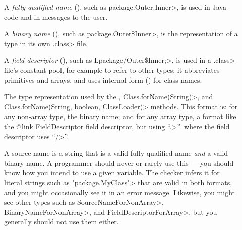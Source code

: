 \begin{description}

\item[]
  A \emph{fully qualified name} (), such as
  \<package.Outer.Inner>, is used in Java code and in messages to
  the user.

\item[]
  A \emph{binary name} (), such as
  \<package.Outer\$Inner>, is
  the representation of a type in its own \<.class> file.

\item[]
  A \emph{field descriptor} (), such as
  \<Lpackage/Outer\$Inner;>, is used in a \<.class> file's constant pool,
  for example to refer to other types; it abbreviates primitives and
  arrays, and uses internal form () for class names.

\item[]
\begin{sloppypar}
  The type representation used by the
  , \<Class.forName(String)>,
  and \<Class.forName(String, boolean, ClassLoader)> methods.  This format
  is:  for any non-array type, the binary name; and for any array type, a
  format like the {@link FieldDescriptor field descriptor}, but using
  ``\<.>''~where the field descriptor uses ``\</>''.
\end{sloppypar}

\item[]
  A source name is a string that is a valid fully qualified name \emph{and}
  a valid binary name.  A programmer should never or rarely use this --- you should
  know how you intend to use a given variable.  The checker infers it for
  literal strings such as \<"package.MyClass"> that are valid in both
  formats, and you might occasionally see it in an error message.
  Likewise, you might see other types such as \<SourceNameForNonArray>,
  \<BinaryNameForNonArray>, and \<FieldDescriptorForArray>, but you
  generally should not use them either.

\end{description}

